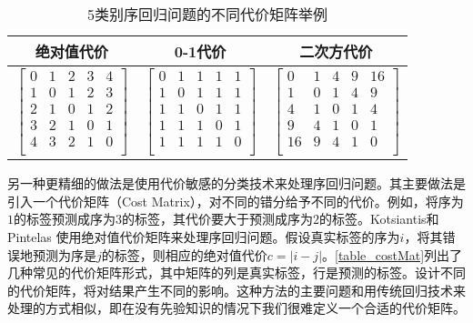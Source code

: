 \begin{table}[!htbp]
\caption{5类别序回归问题的不同代价矩阵举例}
\label{table_costMat}
\centering
\begin{tabular}{ccc}
\toprule
绝对值代价 & 0-1代价 & 二次方代价 \\
\midrule
$ \left[
 \begin{matrix}
   0 & 1 & 2 & 3 & 4 \\
   1 & 0 & 1 & 2 & 3 \\
   2 & 1 & 0 & 1 & 2 \\
   3 & 2 & 1 & 0 & 1 \\
   4 & 3 & 2 & 1 & 0 \\
  \end{matrix}
  \right]
$

&

$ \left[
 \begin{matrix}
   0 & 1 & 1 & 1 & 1 \\
   1 & 0 & 1 & 1 & 1 \\
   1 & 1 & 0 & 1 & 1 \\
   1 & 1 & 1 & 0 & 1 \\
   1 & 1 & 1 & 1 & 0 \\
  \end{matrix}
  \right]
$

&

$ \left[
 \begin{matrix}
   0 & 1 & 4 & 9 & 16 \\
   1 & 0 & 1 & 4 & 9  \\
   4 & 1 & 0 & 1 & 4 \\
   9 & 4 & 1 & 0 & 1 \\
   16 & 9 & 4 & 1 & 0 \\
  \end{matrix}
  \right]
$
\\
\bottomrule
\end{tabular}
\end{table}


另一种更精细的做法是使用代价敏感的分类技术来处理序回归问题。其主要做法是引入一个代价矩阵（Cost Matrix），对不同的错分给予不同的代价。例如，将序为\(1\)的标签预测成序为\(3\)的标签，其代价要大于预测成序为\(2\)的标签。Kotsiantis和Pintelas\citep{kotsiantis2004cost}
使用绝对值代价矩阵来处理序回归问题。假设真实标签的序为\(i\)，将其错误地预测为序是\(j\)的标签，则相应的绝对值代价\(c = \left |  i - j \right |\)。\autoref{table_costMat}列出了几种常见的代价矩阵形式，其中矩阵的列是真实标签，行是预测的标签。设计不同的代价矩阵，将对结果产生不同的影响。这种方法的主要问题和用传统回归技术来处理的方式相似，即在没有先验知识的情况下我们很难定义一个合适的代价矩阵。



